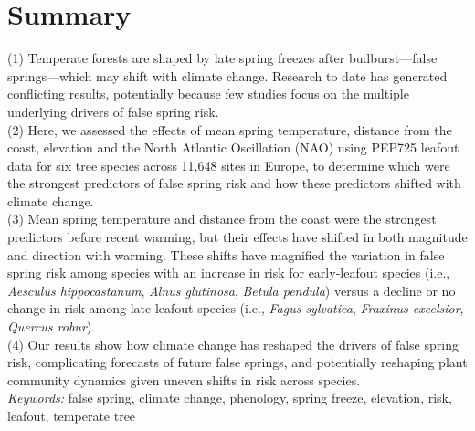 \documentclass{article}\usepackage[]{graphicx}\usepackage[]{color}
\begin{document}
\renewcommand{\thetable}{\arabic{table}}
\renewcommand{\thefigure}{\arabic{figure}}
\renewcommand{\labelitemi}{$-$}




\section*{Summary} %
(1) Temperate forests are shaped by late spring freezes after budburst---false springs---which may shift with climate change. Research to date has generated conflicting results, potentially because few studies focus on the multiple underlying drivers of false spring risk.  \\
(2) Here, we assessed the effects of mean spring temperature, distance from the coast, elevation and the North Atlantic Oscillation (NAO) using PEP725 leafout data for six tree species across 11,648 sites in Europe, to determine which were the strongest predictors of false spring risk and how these predictors shifted with climate change. \\
(3) Mean spring temperature and distance from the coast were the strongest predictors before recent warming, but their effects have shifted in both magnitude and direction with warming. These shifts have magnified the variation in false spring risk among species with an increase in risk for early-leafout species (i.e., \textit{Aesculus hippocastanum}, \textit{Alnus glutinosa}, \textit{Betula pendula}) versus a decline or no change in risk among late-leafout species (i.e., \textit{Fagus sylvatica}, \textit{Fraxinus excelsior}, \textit{Quercus robur}). \\
(4) Our results show how climate change has reshaped the drivers of false spring risk, complicating forecasts of future false springs, and potentially reshaping plant community dynamics given uneven shifts in risk across species. \\

\vspace{2ex}
\textit{Keywords:} false spring, climate change, phenology, spring freeze, elevation, risk, leafout, temperate tree %
\end{document}
